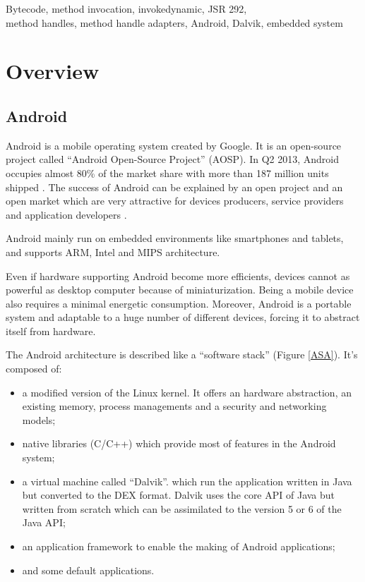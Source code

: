 \documentclass{sig-alternate}
\def \DALVIK{Dalvik\xspace}
\def \ANDROID{Android\xspace}
\def \DEX{DEX\xspace}
\begin{document}


\keywords
Bytecode, method invocation, invokedynamic, JSR 292,\\
method handles, method handle adapters, Android, Dalvik, embedded system

\newpage
\section{Overview}

  \subsection{Android}

    \ANDROID is a mobile operating system created by Google.
    It is an open-source project called ``\ANDROID Open-Source Project'' (AOSP).
    In Q2 2013, \ANDROID occupies almost 80\% of the market share with more than 187 million units shipped \cite{idc-website}.
    The success of \ANDROID can be explained by an open project and an open market
    which are very attractive for devices producers, service providers and application developers \cite{ieee-butler-android-landscape}\cite{ieee-paulson-shift-dynamic-languages}.

    \ANDROID mainly run on embedded environments like smartphones and tablets,
    and supports ARM, Intel and MIPS architecture.
    
    Even if hardware supporting \ANDROID become more efficients,
    devices cannot as powerful as desktop computer because of miniaturization.
    Being a mobile device also requires a minimal energetic consumption.
    Moreover, \ANDROID is a portable system and adaptable to a huge number of different devices,
    forcing it to abstract itself from hardware.

    The \ANDROID architecture is described like a ``software stack'' (Figure \ref{ASA}).
    It's composed of:
    \begin{itemize}
      \item a modified version of the Linux kernel.
        It offers an hardware abstraction, an existing memory, process managements and a security and networking models;
      \item native libraries (C/C++)
        which provide most of features in the \ANDROID system;
      \item a virtual machine called ``\DALVIK''.
        which run the application written in Java but converted to the \DEX format.
        \DALVIK uses the core API of Java but written from scratch
        which can be assimilated to the version 5 or 6 of the Java API;
      \item an application framework to enable the making of \ANDROID applications;
      \item and some default applications.
    \end{itemize}
\end{document}
